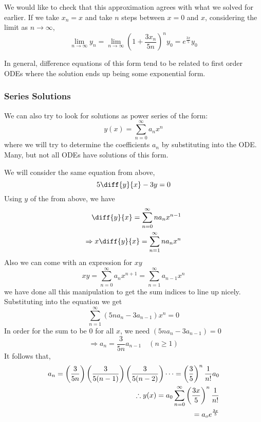 \documentclass{article}
\begin{document}
We would like to check that this approximation agrees with what we solved for earlier. If we take $x_n = x$ and take $n$ steps between $x=0$ and $x$, considering the limit as $n \rightarrow \infty$,
\[
    \lim_{n \rightarrow \infty}y_n = \lim_{n \rightarrow \infty} (1 + \frac{3x_n}{5n})^ny_0 = e^{\frac{3x}{5}}y_0
\]

In general, difference equations of this form tend to be related to first order ODEs where the solution ends up being some exponential form.

\subsubsection*{Series Solutions}

We can also try to look for solutions as power series of the form:
\[
    y(x) = \sum_{n=0}^{\infty}{a_nx^n}    
\]
where we will try to determine the coefficients $a_n$ by substituting into the ODE. Many, but not all ODEs have solutions of this form.

We will consider the same equation from above,
\[
    5 \diff{y}{x} - 3y = 0
\]
Using $y$ of the from above, we have
\begin{align*}
    \diff{y}{x} = \sum_{n=0}^{\infty}{na_nx^{n-1}} \\
    \Rightarrow x\diff{y}{x} = \sum_{n=1}^{\infty}{na_nx^{n}}
\end{align*}
Also we can come with an expression for $xy$
\[
    xy = \sum_{n=0}^{\infty}{a_nx^{n+1}} = \sum_{n=1}^{\infty}{a_{n-1}x^{n}}
\]
we have done all this manipulation to get the sum indices to line up nicely. Substituting into the equation we get
\[
    \sum_{n=1}^{\infty}(5na_n - 3a_{n-1})x^n = 0
\]
In order for the sum to be $0$ for all $x$, we need $(5na_n - 3a_{n-1}) = 0$
\[
    \Rightarrow a_n = \frac{3}{5n}a_{n-1} \quad (n \geq 1)
\]
It follows that,
\begin{align*}
    a_n = \left( \frac{3}{5n} \right)\left( \frac{3}{5(n-1)} \right)\left( \frac{3}{5(n-2)} \right)\cdots = \left( \frac{3}{5} \right)^n\frac{1}{n!}a_0 \\
    \therefore y(x) = a_0 \sum_{n=0}^{\infty}\left( \frac{3x}{5} \right)^n\frac{1}{n!} \\
    = a_o e^\frac{3x}{5}
\end{align*}
\end{document}
